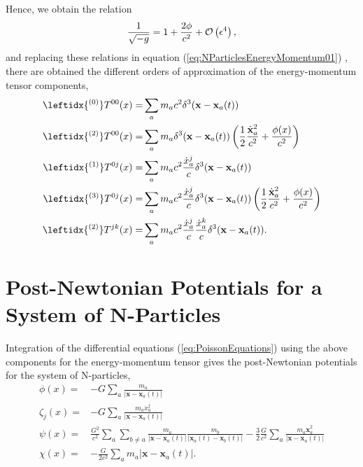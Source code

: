 Hence, we obtain the relation
\begin{equation}
\frac{1}{\sqrt{-g}} = 1 + \frac{2\phi}{c^2} +  {\mathcal{O}} \left( \epsilon^4 \right),
\end{equation}
and replacing these relations in equation (\ref{eq:NParticlesEnergyMomentum01}) , there are obtained the different orders of approximation of the energy-momentum tensor components,
\begin{subequations}\label{eq:NParticlesEnergyMomentum}
\begin{align}
\leftidx{^{(0)}} T^{00} (x) = & \sum _a m_a c^2 \delta^3 (\textbf{x} - \textbf{x}_a (t)) \\
\leftidx{^{(2)}} T^{00} (x) = & \sum _a m_a \delta^3 (\textbf{x} - \textbf{x}_a (t)) \left( \frac{1}{2} \frac{\dot{\textbf{x}}^2_a}{c^2} + \frac{\phi (x)}{c^2} \right) \\
\leftidx{^{(1)}} T^{0j} (x) = & \sum _a m_a c^2 \frac{\dot{x}^j_a}{c}\delta^3 (\textbf{x} - \textbf{x}_a (t)) \\
\leftidx{^{(3)}} T^{0j} (x) = & \sum _a m_a c^2 \frac{\dot{x}^j_a}{c}\delta^3 (\textbf{x} - \textbf{x}_a (t))  \left( \frac{1}{2} \frac{\dot{\textbf{x}}^2_a}{c^2} + \frac{\phi (x)}{c^2} \right) \\
\leftidx{^{(2)}} T^{jk} (x) = & \sum _a m_a c^2 \frac{\dot{x}^j_a}{c}  \frac{\dot{x}^k_a}{c} \delta^3 (\textbf{x} - \textbf{x}_a (t)) .
\end{align}
\end{subequations}

\section{Post-Newtonian Potentials for a System of N-Particles}
Integration of the differential equations (\ref{eq:PoissonEquations}) using the above components for the energy-momentum tensor gives the post-Newtonian potentials for the system of N-particles,
\begin{subequations}\label{eq:NParticlesPNPotentials}
\begin{align}
\phi (x) = &- G \sum _a \frac{m_a}{\left| \textbf{x} - \textbf{x}_a (t)\right|} \\
\zeta_j (x) = & - G \sum _a \frac{m_a \dot{x}^j _a}{\left| \textbf{x} - \textbf{x}_a (t)\right|} \\
\psi (x) =  &\frac{G^2}{c^2} \sum _a \sum _{b \neq a} \frac{m_a }{\left| \textbf{x} - \textbf{x}_a (t)\right|} \frac{m_b }{\left| \textbf{x}_a (t) - \textbf{x}_b (t) \right|} - \frac{3}{2} \frac{G}{c^2} \sum _a \frac{m_a \dot{\textbf{x}}^2 _a}{\left| \textbf{x} - \textbf{x}_a (t)\right|} \\
\chi (x) = & - \frac{G}{2c^2} \sum _a m_a \left| \textbf{x} - \textbf{x}_a (t)\right| .
\end{align}
\end{subequations}

